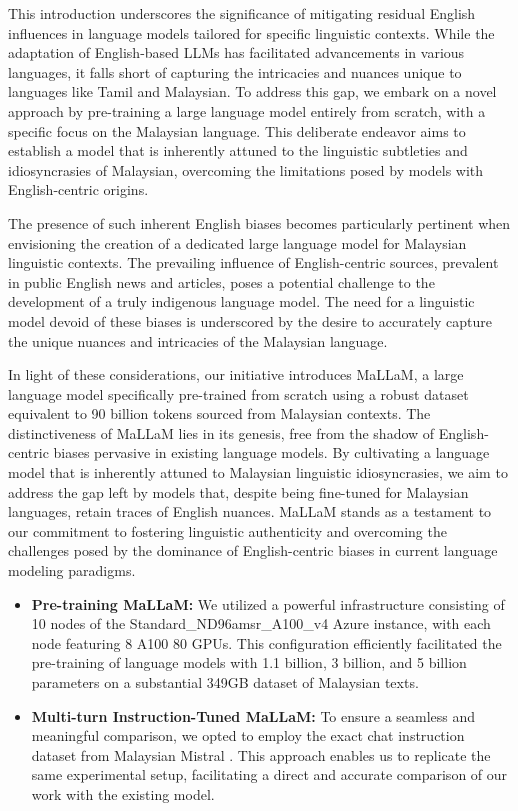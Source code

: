 \documentclass[preprint]{article}
\begin{document}
This introduction underscores the significance of mitigating residual English influences in language models tailored for specific linguistic contexts. While the adaptation of English-based LLMs has facilitated advancements in various languages, it falls short of capturing the intricacies and nuances unique to languages like Tamil and Malaysian. To address this gap, we embark on a novel approach by pre-training a large language model entirely from scratch, with a specific focus on the Malaysian language. This deliberate endeavor aims to establish a model that is inherently attuned to the linguistic subtleties and idiosyncrasies of Malaysian, overcoming the limitations posed by models with English-centric origins.

The presence of such inherent English biases becomes particularly pertinent when envisioning the creation of a dedicated large language model for Malaysian linguistic contexts. The prevailing influence of English-centric sources, prevalent in public English news and articles, poses a potential challenge to the development of a truly indigenous language model. The need for a linguistic model devoid of these biases is underscored by the desire to accurately capture the unique nuances and intricacies of the Malaysian language.

In light of these considerations, our initiative introduces MaLLaM, a large language model specifically pre-trained from scratch using a robust dataset equivalent to 90 billion tokens sourced from Malaysian contexts. The distinctiveness of MaLLaM lies in its genesis, free from the shadow of English-centric biases pervasive in existing language models. By cultivating a language model that is inherently attuned to Malaysian linguistic idiosyncrasies, we aim to address the gap left by models that, despite being fine-tuned for Malaysian languages, retain traces of English nuances. MaLLaM stands as a testament to our commitment to fostering linguistic authenticity and overcoming the challenges posed by the dominance of English-centric biases in current language modeling paradigms.

\begin{itemize}
  \item \textbf{Pre-training MaLLaM:} We utilized a powerful infrastructure consisting of 10 nodes of the Standard\_ND96amsr\_A100\_v4 Azure instance, with each node featuring 8 A100 80 GPUs. This configuration efficiently facilitated the pre-training of language models with 1.1 billion, 3 billion, and 5 billion parameters on a substantial 349GB dataset of Malaysian texts.

  \item \textbf{Multi-turn Instruction-Tuned MaLLaM:} To ensure a seamless and meaningful comparison, we opted to employ the exact chat instruction dataset from Malaysian Mistral \cite{zolkepli2024large}. This approach enables us to replicate the same experimental setup, facilitating a direct and accurate comparison of our work with the existing model.
\end{itemize}
\end{document}
